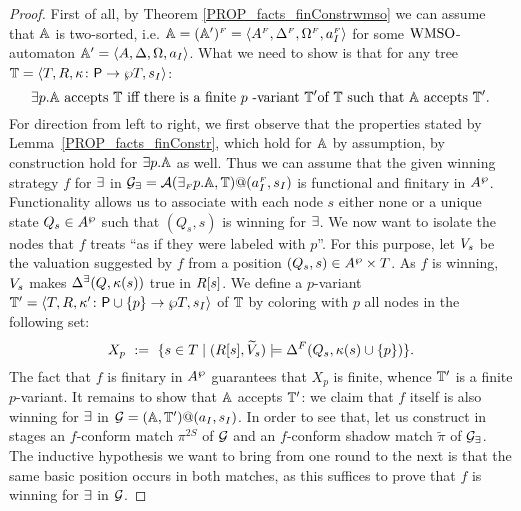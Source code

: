 \begin{proof}
First of all, by Theorem \ref{PROP_facts_finConstrwmso} we can assume that $\mathbb{A}$ is two-sorted, i.e. $\mathbb{A} = (\mathbb{A}')^{{\scriptscriptstyle F}} = \langle{A^{{\scriptscriptstyle F}}, \Delta^{{\scriptscriptstyle F}},\Omega^{{\scriptscriptstyle F}},a_I^{{\scriptscriptstyle F}}}\rangle$ for some $\mathrm{WMSO}$-automaton $\mathbb{A}' = \langle{A,\Delta,\Omega, a_I}\rangle$. What we need to show is that for any tree $\mathbb{T} = \langle{T,R,\kappa\colon \mathsf{P}\to \wp T,s_I}\rangle$:
$${{\exists} p}.\aut \text{ accepts } \bbT \text{ iff } \text{there is a finite }p \text{ -variant }\bbT' \text{of } \bbT \text{  such that } \aut \text{  accepts } \bbT'.$$
For direction from left to right, we first observe that the properties stated by Lemma~\ref{PROP_facts_finConstr}, which hold for $\mathbb{A}$ by assumption, by construction hold for ${{\exists} p}.\mathbb{A}$ as well. Thus we can assume that the given winning strategy $f$ for $\exists$ in $\mathcal{G_{\exists}} = \mathcal{A}({\exists_{{\scriptscriptstyle F}} p}.\mathbb{A},\mathbb{T})@(a_I^{{\scriptscriptstyle F}},s_I)$ is functional and finitary in $A^{\wp}$. Functionality allows us to associate with each node $s$ either none or a unique state $Q_s \in A^{\wp}$ such that $(Q_s,s)$ is winning for $\exists$. We now want to isolate the nodes that $f$ treats ``as if they were labeled with $p$''. For this purpose, let $V_{s}$ be the valuation suggested by $f$ from a position $(Q_s,s) \in A^{\wp} \times T$. As $f$ is winning, $V_{s}$ makes $\Delta^\exists(Q,\kappa(s))$ true in $R[s]$. We define a $p$-variant $\mathbb{T}' = \langle{T,R,\kappa' \colon \mathsf{P}\cup\{p\} \to \wp T,s_I}\rangle$ of $\mathbb{T}$ by coloring with $p$ all nodes in the following set:
 \begin{equation}\label{eq:X_p}
   X_p\ :=\ \{s \in T\mid (\R{s},\widetilde{\val}_{s}) \models \tmap^{\f}(Q_s,\tscolors(s)\cup\{p\})\}.
\end{equation}
The fact that $f$ is finitary in $A^{\wp}$ guarantees that $X_p$ is finite, whence $\mathbb{T}'$ is a finite $p$-variant. It remains to show that $\mathbb{A}$ accepts $\mathbb{T}'$: we claim that $f$ itself is also winning for $\exists$ in $\mathcal{G} = (\mathbb{A},\mathbb{T}')@(a_I,s_I)$. In order to see that, let us construct in stages an $f$-conform match $\pi^{2S}$ of $\mathcal{G}$ and an $f$-conform shadow match $\tilde{\pi}$ of $\mathcal{G_{\exists}}$. The inductive hypothesis we want to bring from one round to the next is that the same basic position occurs in both matches, as this suffices to prove that $f$ is winning for $\exists$ in $\mathcal{G}$.


\end{proof}
